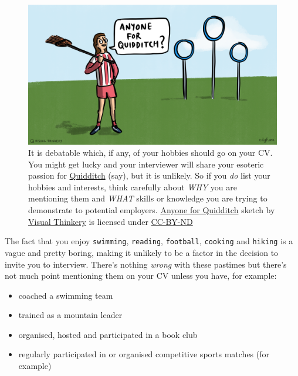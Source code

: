 \documentclass[
]{book}
\providecommand{\tightlist}{%
  \setlength{\itemsep}{0pt}\setlength{\parskip}{0pt}}
\begin{document}
\begin{figure}

{\centering \includegraphics[width=0.98\linewidth]{images/Anyone for quidditch} 

}

\caption{It is debatable which, if any, of your hobbies should go on your CV. You might get lucky and your interviewer will share your esoteric passion for \href{https://en.wikipedia.org/wiki/Quidditch_(real-life_sport)}{Quidditch} (say), but it is unlikely. So if you \emph{do} list your hobbies and interests, think carefully about \emph{WHY} you are mentioning them and \emph{WHAT} skills or knowledge you are trying to demonstrate to potential employers. \href{https://en.wikipedia.org/wiki/Anyone_for_tennis\%3F}{Anyone for Quidditch} sketch by \href{https://visualthinkery.com/}{Visual Thinkery} is licensed under \href{https://creativecommons.org/licenses/by-nd/4.0/}{CC-BY-ND}}\label{fig:quidditch-fig}
\end{figure}



The fact that you enjoy \texttt{swimming}, \texttt{reading}, \texttt{football}, \texttt{cooking} and \texttt{hiking} is a vague and pretty boring, making it unlikely to be a factor in the decision to invite you to interview. There's nothing \emph{wrong} with these pastimes but there's not much point mentioning them on your CV unless you have, for example:

\begin{itemize}
\tightlist
\item
  coached a swimming team
\item
  trained as a mountain leader
\item
  organised, hosted and participated in a book club
\item
  regularly participated in or organised competitive sports matches (for example)
\end{itemize}
\end{document}
